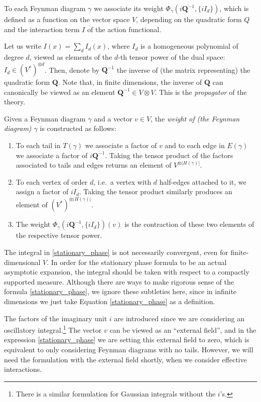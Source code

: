 \documentclass[reqno]{amsart}
\theoremstyle{definition}
\theoremstyle{remark}
\begin{document}
To each Feynman diagram $\gamma$ we associate its weight $\Phi_\gamma(i\mathbf{Q}^{-1},\{iI_d\})$, which is defined as a function on the vector space $V$, depending on the quadratic form $Q$ and the interaction term $I$ of the action functional. 

Let us write $I(x)=\sum_d I_d(x)$, where $I_d$ is a homogeneous polynomial of degree $d$, viewed as elements of the $d$-th tensor power of the dual space: $I_d \in (V^*)^{\otimes d}$. Then, denote by $\mathbf{Q}^{-1}$ the inverse of (the matrix representing) the quadratic form $\mathbf{Q}$. Note that, in finite dimensions, the inverse of $\mathbf{Q}$ can canonically be viewed as an element $\mathbf{Q}^{-1} \in V\otimes V$. This is the \emph{propagator} of the theory.

Given a Feynman diagram $\gamma$ and a vector $v\in V$, the \emph{weight of (the Feynman diagram) $\gamma$} is constructed as follows:
\begin{enumerate}
    \item To each tail in $T(\gamma)$ we associate a factor of $v$ and to each edge in $E(\gamma)$ we associate a factor of $i\mathbf{Q}^{-1}$. Taking the tensor product of the factors associated to tails and edges returns an element of $V^{\otimes |H(\gamma)|}$.
    \item To each vertex of order $d$, i.e.\ a vertex with $d$ half-edges attached to it, we assign a factor of $iI_d$. Taking the tensor product similarly produces an element of $(V^*)^{\otimes |H(\gamma)|}$.
    \item The weight $\Phi_\gamma(i\mathbf{Q}^{-1},\{iI_d\})(v)$ is the contraction of these two elements of the respective tensor power. 
\end{enumerate}

\begin{rmk}
The integral in \eqref{stationary_phase} is not necessarily convergent, even for finite-dimensional $V$. In order for the stationary phase formula to be an actual asymptotic expansion, the integral should be taken with respect to a compactly supported measure. {Although there are ways to make rigorous sense of the formula \eqref{stationary_phase}, we ignore these subtleties here}, since in infinite dimensions we just take Equation \eqref{stationary_phase} as a definition.
\end{rmk}



\begin{rmk}
The factors of the imaginary unit $i$ are introduced since we are considering an oscillatory integral.\footnote{There is a similar formulation for Gaussian integrals without the $i$'s.} The vector $v$ can be viewed as an ``external field'', and in the expression \eqref{stationary_phase} we are setting this external field to zero, which is equivalent to only considering Feynman diagrams with no tails. However, we will need the formulation with the external field shortly, when we consider effective interactions.
\end{rmk}
\end{document}
